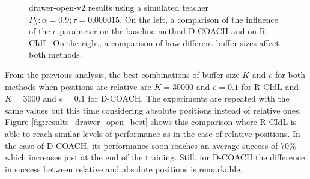  \begin{figure}[H]
  \centering
   \hfill

  \caption{drawer-open-v2 results using a simulated teacher $P_h: \alpha = 0.9; \tau =  0.000015$. On the left, a comparison of the influence of the $e$ parameter on the baseline method D-COACH and on R-CIdL. On the right, a comparison of how different buffer sizes affect both methods.}
  \label{fig:results_drawer_open_buffer_e}
\end{figure}

From the previous analysis, the best combinations of buffer size $K$ and $e$ for both methods when positions are relative are $K=30000$ and $e=0.1$ for R-CIdL and $K=3000$ and $e=0.1$ for D-COACH. The experiments are repeated with the same values but this time considering absolute positions instead of relative ones. Figure \ref{fig:results_drawer_open_best}  shows this comparison where R-CIdL is able to reach similar levels of performance as in the case of relative positions. In the case of D-COACH, its performance soon reaches an average success of 70\% which increases just at the end of the training. Still, for D-COACH the difference in success between relative and absolute positions is remarkable.


